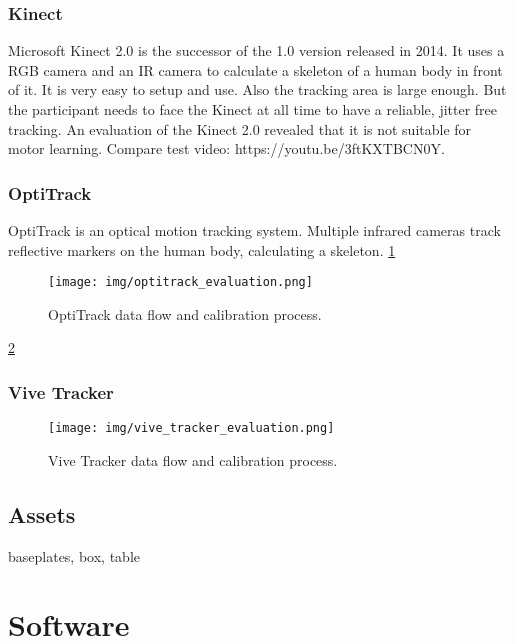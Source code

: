 \subsubsection{Kinect}
Microsoft Kinect 2.0 is the successor of the 1.0 version released in 2014. It uses a RGB camera and an IR camera to calculate a skeleton of a human body in front of it. It is very easy to setup and use. Also the tracking area is large enough. But the participant needs to face the Kinect at all time to have a reliable, jitter free tracking. An evaluation of the Kinect 2.0 revealed that it is not suitable for motor learning. Compare test video: https://youtu.be/3ftKXTBCN0Y.
\subsubsection{OptiTrack}
OptiTrack is an optical motion tracking system. Multiple infrared cameras track reflective markers on the human body, calculating a skeleton. \ref{fig:optitrack}
\begin{figure}
	\centering
	\texttt{[image: img/optitrack\_evaluation.png]}
	\caption{OptiTrack data flow and calibration process.}
	\label{fig:optitrack}
\end{figure}
\ref{fig:viveTracker}
\subsubsection{Vive Tracker}
\begin{figure}
	\centering
	\texttt{[image: img/vive\_tracker\_evaluation.png]}
	\caption{Vive Tracker data flow and calibration process.}
	\label{fig:viveTracker}
\end{figure}
\subsection{Assets}
baseplates, box, table
\section{Software}
